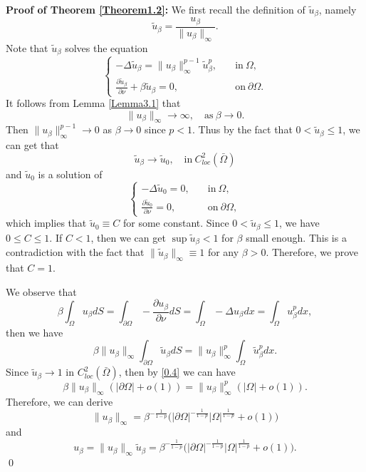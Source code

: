\documentclass[12pt,reqno]{amsart}
\numberwithin{equation}{section}
\theoremstyle{definition}
\begin{document}
{\bf Proof of Theorem \ref{Theorem1.2}:}
We first recall the definition of $\tilde{u}_\beta$, namely 
$$
\tilde{u}_\beta=\frac{u_\beta}{\|u_\beta\|_\infty}.
$$
Note that $\tilde{u}_\beta$ solves the equation 
\begin{equation}\label{0.1}
\begin{cases}
-\Delta \tilde{u}_\beta=\|u_\beta\|_{\infty}^{p-1}\tilde{u}_\beta^p,\quad  &\text{in}\ \Omega,\\
\frac{\partial \tilde{u}_\beta}{\partial \nu}+\beta \tilde{u}_\beta=0, &\text{on}\ \partial\Omega.
\end{cases}
\end{equation}
It follows from Lemma \ref{Lemma3.1} that 
$$
\|u_\beta\|_\infty\to \infty,\quad \text{as}\ \beta\to 0.
$$
Then $\|u_\beta\|_\infty^{p-1}\to 0$ as $\beta\to 0$ since $p<1$.
Thus by the fact that $0<\tilde{u}_\beta\le 1$, we can get that 
$$
\tilde{u}_\beta\to \tilde{u}_0,\quad  \text{in} \ C^2_{loc}(\bar{\Omega})
$$ 
and $\tilde{u}_0$ is a solution of 
\begin{equation}\label{0.2}
\begin{cases}
-\Delta \tilde{u}_0=0,\quad  &\text{in}\ \Omega,\\
\frac{\partial \tilde{u}_0}{\partial \nu}=0, &\text{on}\ \partial\Omega,
\end{cases}
\end{equation}
which implies that $\tilde{u}_0\equiv C$ for some constant. Since $0<\tilde{u}_\beta\le 1$, we have $0\le C\le 1$. If $C<1$, then we can get $\sup \tilde{u}_\beta<1$ for $\beta$ small enough. This is a contradiction with the fact that $\|\tilde{u}_\beta\|_\infty\equiv 1$ for any $\beta>0$. Therefore, we prove that $C=1$.

We observe that 
\begin{equation}
\beta\int_{\Omega}u_\beta dS=\int_{\partial\Omega}-\frac{\partial u_\beta}{\partial \nu}dS=\int_{\Omega}-\Delta u_\beta dx=\int_{\Omega}u_\beta^pdx,
\end{equation}
then we have 
\begin{equation}\label{0.4}
\beta\|u_\beta\|_{\infty}\int_{\partial\Omega}\tilde{u}_\beta dS=\|u_\beta\|_{\infty}^p\int_{\Omega}\tilde{u}_\beta^pdx.
\end{equation}
Since $\tilde{u}_\beta\to 1$ in $C^2_{loc}(\bar{\Omega})$, then by \eqref{0.4} we can have 
\begin{equation}\label{0.5}
\beta\|u_\beta\|_{\infty}(|\partial\Omega|+o(1))=\|u_\beta\|_{\infty}^p(|\Omega|+o(1)).
\end{equation}
Therefore, we can derive 
\begin{equation}\label{0.6}
\|u_\beta\|_{\infty}=\beta^{-\frac{1}{1-p}}\Big(|\partial\Omega|^{-\frac{1}{1-p}}|\Omega|^{\frac{1}{1-p}} +o(1)\Big)
\end{equation}
and 
\begin{equation}\label{0.7}
u_\beta=\|u_\beta\|_{\infty}\tilde{u}_\beta=\beta^{-\frac{1}{1-p}}\Big(|\partial\Omega|^{-\frac{1}{1-p}}|\Omega|^{\frac{1}{1-p}} +o(1)\Big).
\end{equation}
\qed
\end{document}
